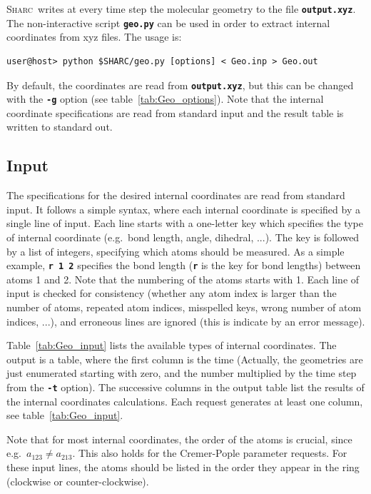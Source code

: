 \documentclass[a4paper,10pt,DIV=15,openany,twoside=false]{scrbook}
\newcommand{\sharc}{\textsc{Sharc}}
\newcommand{\ttt}[1]{\textbf{\texttt{#1}}}
\begin{document}
\sharc\ writes at every time step the molecular geometry to the file \ttt{output.xyz}. The non-interactive script \ttt{geo.py} can be used in order to extract internal coordinates from xyz files. The usage is:
\begin{verbatim}
user@host> python $SHARC/geo.py [options] < Geo.inp > Geo.out
\end{verbatim}
By default, the coordinates are read from \ttt{output.xyz}, but this can be changed with the \ttt{-g} option (see table~\ref{tab:Geo_options}). Note that the internal coordinate specifications are read from standard input and the result table is written to standard out. 

\subsection{Input}

The specifications for the desired internal coordinates are read from standard input. It follows a simple syntax, where each internal coordinate is specified by a single line of input. Each line starts with a one-letter key which specifies the type of internal coordinate (e.g.\ bond length, angle, dihedral, ...). The key is followed by a list of integers, specifying which atoms should be measured. As a simple example, \ttt{r 1 2} specifies the bond length (\ttt{r} is the key for bond lengths) between atoms 1 and 2. Note that the numbering of the atoms starts with 1. Each line of input is checked for consistency (whether any atom index is larger than the number of atoms, repeated atom indices, misspelled keys, wrong number of atom indices, ...), and erroneous lines are ignored (this is indicate by an error message).

Table~\ref{tab:Geo_input} lists the available types of internal coordinates. The output is a table, where the first column is the time (Actually, the geometries are just enumerated starting with zero, and the number multiplied by the time step from the \ttt{-t} option). The successive columns in the output table list the results of the internal coordinates calculations. Each request generates at least one column, see table~\ref{tab:Geo_input}. 

Note that for most internal coordinates, the order of the atoms is crucial, since e.g.\ $a_{123}\neq a_{213}$. This also holds for the Cremer-Pople parameter requests. For these input lines, the atoms should be listed in the order they appear in the ring (clockwise or counter-clockwise).
\end{document}
